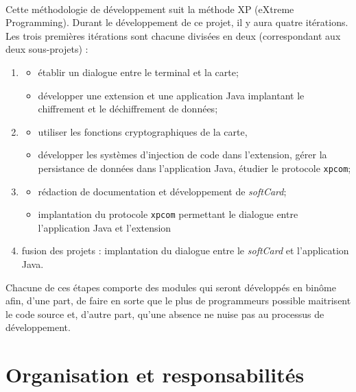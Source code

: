 \documentclass[a4paper,11pt,french]{article}
\begin{document}
\paragraph{}
Cette méthodologie de développement suit la méthode XP (eXtreme Programming). 
Durant le développement de ce projet, il y aura quatre itérations. Les
trois premières itérations sont chacune divisées en deux (correspondant
aux deux sous-projets) : 
\begin{enumerate}
 \item \begin{itemize}
            \item établir un dialogue entre le terminal et la carte;
            \item développer une extension et une application Java implantant
           le chiffrement et le déchiffrement de données; 
       \end{itemize}
 \item \begin{itemize}
            \item utiliser les fonctions cryptographiques de la carte, 
            \item développer les systèmes d'injection de code dans l'extension,
            gérer la persistance de données dans l'application Java, étudier
            le protocole \texttt{xpcom};
       \end{itemize}
 \item \begin{itemize}
            \item rédaction de documentation et développement de 
            \emph{softCard};
            \item implantation du protocole \texttt{xpcom} permettant
            le dialogue entre l'application Java et l'extension
       \end{itemize}
 \item fusion des projets : implantation du dialogue entre le \emph{softCard}
 et l'application Java.
\end{enumerate}
Chacune de ces étapes comporte des modules qui seront développés en binôme
afin, d'une part, de faire en sorte que le plus de programmeurs possible
maitrisent le code source et, d'autre part, qu'une absence ne nuise pas au
processus de développement. 

\section{Organisation et responsabilités}
\end{document}
